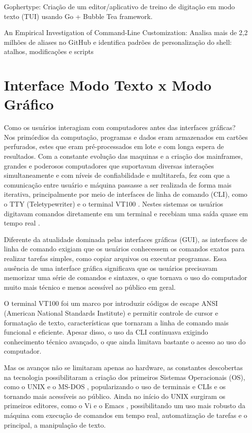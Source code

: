 Gophertype: Criação de um editor/aplicativo de treino de digitação em modo texto (TUI) usando Go + Bubble Tea framework. \cite{Lindroos2025}

An Empirical Investigation of Command-Line Customization: Analisa mais de 2,2 milhões de aliases no GitHub e identifica padrões de personalização do shell:
atalhos, modificações e scripts \cite{SchroderCito2022}

\section{Interface Modo Texto x Modo Gráfico}

Como os usuários interagiam com computadores antes das interfaces gráficas? Nos primórdios da computação, programas e dados eram armazenados em cartões
perfurados, estes que eram pré-processados em lote e com longa espera de resultados. Com a constante evolução das maquinas e a criação dos mainframes,
grandes e poderosos computadores que suportavam diversas interações simultaneamente e com níveis de confiabilidade e multitarefa, fez com que a comunicação
entre usuário e máquina passasse a ser realizada de forma mais iterativa, principalmente por meio de interfaces de linha de comando (CLI),
como o TTY (Teletypewriter) \cite{ColumbiaTeletype2023} e o terminal VT100 \cite{DEC_VT100}. Nestes sistemas os usuários digitavam comandos diretamente em um
terminal e recebiam uma saída quase em tempo real \cite{ComputerHistoryMuseum}.

Diferente da atualidade dominada pelas interfaces gráficas (GUI), as interfaces de linha de comando exigiam que os usuários conhecessem os comandos exatos
para realizar tarefas simples, como copiar arquivos ou executar programas. Essa ausência de uma interface gráfica significava que os usuários precisavam
memorizar uma série de comandos e sintaxes, o que tornava o uso do computador muito mais técnico e menos acessível ao público em geral.

O terminal VT100 foi um marco por introduzir códigos de escape ANSI (American National Standards Institute) e permitir controle de cursor e formatação de texto,
características que tornaram a linha de comando mais funcional e eficiente. Apesar disso, o uso da CLI continuava exigindo conhecimento técnico avançado, o que
ainda limitava bastante o acesso ao uso do computador.

Mas os avanços não se limitaram apenas ao hardware, as constantes descobertas na tecnologia possibilitaram a criação dos primeiros Sistemas Operacionais (OS),
como o UNIX \cite{UnixArchive} e o MS-DOS \cite{ComputerHistoryMuseum}, popularizando o uso de terminais e CLIs e os tornando mais acessíveis ao público. Ainda
no início do UNIX surgiram os primeiros editores, como o Vi \cite{Joy_Vi} e o Emacs \cite{Stallman1981}, possibilitando um uso mais robusto da máquina com
execução de comandos em tempo real, automatização de tarefas e o principal, a manipulação de texto.

